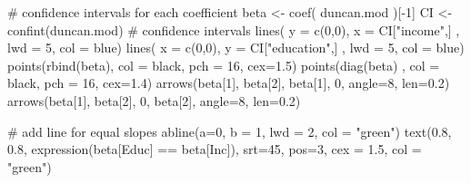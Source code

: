 \documentclass[
  letterpaper,
  10pt,
  krantz2]{krantz}
\makeatletter
\newenvironment{Shaded}{\begin{snugshade}}{\end{snugshade}}
\newcommand{\AttributeTok}[1]{\textcolor[rgb]{0.40,0.45,0.13}{#1}}
\newcommand{\CommentTok}[1]{\textcolor[rgb]{0.37,0.37,0.37}{#1}}
\newcommand{\DecValTok}[1]{\textcolor[rgb]{0.68,0.00,0.00}{#1}}
\newcommand{\FloatTok}[1]{\textcolor[rgb]{0.68,0.00,0.00}{#1}}
\newcommand{\FunctionTok}[1]{\textcolor[rgb]{0.28,0.35,0.67}{#1}}
\newcommand{\NormalTok}[1]{\textcolor[rgb]{0.00,0.23,0.31}{#1}}
\newcommand{\OtherTok}[1]{\textcolor[rgb]{0.00,0.23,0.31}{#1}}
\newcommand{\SpecialCharTok}[1]{\textcolor[rgb]{0.37,0.37,0.37}{#1}}
\newcommand{\StringTok}[1]{\textcolor[rgb]{0.13,0.47,0.30}{#1}}
\newenvironment{kframe}{%
  \medskip{}
  \setlength{\fboxsep}{.8em}
  \def\at@end@of@kframe{}%
  \ifinner\ifhmode%
  \def\at@end@of@kframe{\end{minipage}}%
  \begin{minipage}{\columnwidth}%
  \fi\fi%
  \def\FrameCommand##1{\hskip\@totalleftmargin \hskip-\fboxsep
  \colorbox{shadecolor}{##1}\hskip-\fboxsep
      \hskip-\linewidth \hskip-\@totalleftmargin \hskip\columnwidth}%
  \MakeFramed {\advance\hsize-\width
    \@totalleftmargin\z@ \linewidth\hsize
    \@setminipage}}%
{\par\unskip\endMakeFramed%
  \at@end@of@kframe}
\renewenvironment{Shaded}{\begin{kframe}}{\end{kframe}}
\makeatother
\begin{document}
\begin{Shaded}
\begin{Highlighting}[]
\CommentTok{\# confidence intervals for each coefficient}
\NormalTok{beta }\OtherTok{\textless{}{-}} \FunctionTok{coef}\NormalTok{( duncan.mod )[}\SpecialCharTok{{-}}\DecValTok{1}\NormalTok{]}
\NormalTok{CI }\OtherTok{\textless{}{-}} \FunctionTok{confint}\NormalTok{(duncan.mod)       }\CommentTok{\# confidence intervals}
\FunctionTok{lines}\NormalTok{( }\AttributeTok{y =} \FunctionTok{c}\NormalTok{(}\DecValTok{0}\NormalTok{,}\DecValTok{0}\NormalTok{), }\AttributeTok{x =}\NormalTok{ CI[}\StringTok{"income"}\NormalTok{,] , }\AttributeTok{lwd =} \DecValTok{5}\NormalTok{, }\AttributeTok{col =} \StringTok{\textquotesingle{}blue\textquotesingle{}}\NormalTok{)}
\FunctionTok{lines}\NormalTok{( }\AttributeTok{x =} \FunctionTok{c}\NormalTok{(}\DecValTok{0}\NormalTok{,}\DecValTok{0}\NormalTok{), }\AttributeTok{y =}\NormalTok{ CI[}\StringTok{"education"}\NormalTok{,] , }\AttributeTok{lwd =} \DecValTok{5}\NormalTok{, }\AttributeTok{col =} \StringTok{\textquotesingle{}blue\textquotesingle{}}\NormalTok{)}
\FunctionTok{points}\NormalTok{(}\FunctionTok{rbind}\NormalTok{(beta), }\AttributeTok{col =} \StringTok{\textquotesingle{}black\textquotesingle{}}\NormalTok{, }\AttributeTok{pch =} \DecValTok{16}\NormalTok{, }\AttributeTok{cex=}\FloatTok{1.5}\NormalTok{)}
\FunctionTok{points}\NormalTok{(}\FunctionTok{diag}\NormalTok{(beta) , }\AttributeTok{col =} \StringTok{\textquotesingle{}black\textquotesingle{}}\NormalTok{, }\AttributeTok{pch =} \DecValTok{16}\NormalTok{, }\AttributeTok{cex=}\FloatTok{1.4}\NormalTok{)}
\FunctionTok{arrows}\NormalTok{(beta[}\DecValTok{1}\NormalTok{], beta[}\DecValTok{2}\NormalTok{], beta[}\DecValTok{1}\NormalTok{], }\DecValTok{0}\NormalTok{, }\AttributeTok{angle=}\DecValTok{8}\NormalTok{, }\AttributeTok{len=}\FloatTok{0.2}\NormalTok{)}
\FunctionTok{arrows}\NormalTok{(beta[}\DecValTok{1}\NormalTok{], beta[}\DecValTok{2}\NormalTok{], }\DecValTok{0}\NormalTok{, beta[}\DecValTok{2}\NormalTok{], }\AttributeTok{angle=}\DecValTok{8}\NormalTok{, }\AttributeTok{len=}\FloatTok{0.2}\NormalTok{)}

\CommentTok{\# add line for equal slopes}
\FunctionTok{abline}\NormalTok{(}\AttributeTok{a=}\DecValTok{0}\NormalTok{, }\AttributeTok{b =} \DecValTok{1}\NormalTok{, }\AttributeTok{lwd =} \DecValTok{2}\NormalTok{, }\AttributeTok{col =} \StringTok{"green"}\NormalTok{)}
\FunctionTok{text}\NormalTok{(}\FloatTok{0.8}\NormalTok{, }\FloatTok{0.8}\NormalTok{, }\FunctionTok{expression}\NormalTok{(beta[Educ] }\SpecialCharTok{==}\NormalTok{ beta[Inc]), }
     \AttributeTok{srt=}\DecValTok{45}\NormalTok{, }\AttributeTok{pos=}\DecValTok{3}\NormalTok{, }\AttributeTok{cex =} \FloatTok{1.5}\NormalTok{, }\AttributeTok{col =} \StringTok{"green"}\NormalTok{)}


\end{Highlighting}
\end{Shaded}
\end{document}
